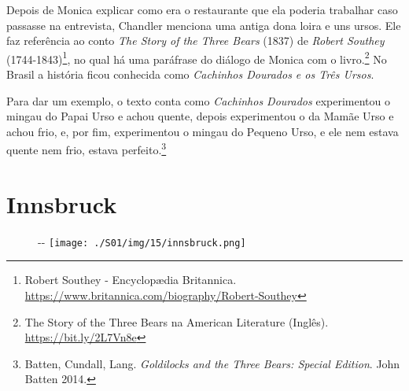 Depois de Monica explicar como era o restaurante que ela poderia
trabalhar caso passasse na entrevista, Chandler menciona uma antiga dona
loira e uns ursos. Ele faz referência ao conto \emph{The Story of the
Three Bears} (1837) de \emph{Robert Southey} (1744-1843)\footnote{\sloppy Robert Southey - Encyclopædia Britannica. \url{https://www.britannica.com/biography/Robert-Southey}},
no qual há uma paráfrase do diálogo de Monica com o livro.\footnote{\sloppy The Story of the Three Bears na American Literature (Inglês). \url{https://bit.ly/2L7Vn8e}}
No Brasil a história ficou conhecida como \emph{Cachinhos Dourados e os
Três Ursos}.

Para dar um exemplo, o texto conta como \emph{Cachinhos Dourados}
experimentou o mingau do Papai Urso e achou quente, depois experimentou
o da Mamãe Urso e achou frio, e, por fim, experimentou o mingau do
Pequeno Urso, e ele nem estava quente nem frio, estava
perfeito.\footnote{Batten, Cundall, Lang. \emph{Goldilocks and the Three
  Bears: Special Edition}. John Batten 2014.}

\hypertarget{innsbruck}{%
\section{Innsbruck}\label{innsbruck}}

\begin{figure}[!ht]
  \begin{adjustwidth}{-\oddsidemargin-1in}{-\rightmargin}
    \centering
    \texttt{[image: ./S01/img/15/innsbruck.png]}
  \end{adjustwidth}
\end{figure}

